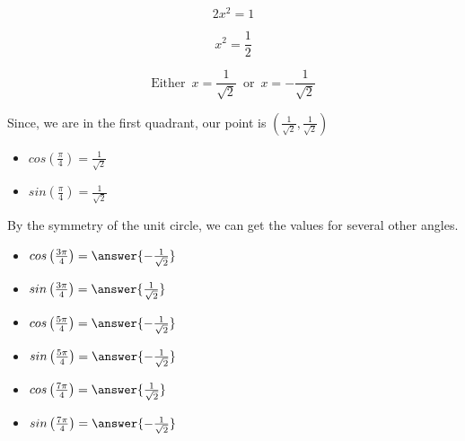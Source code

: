 \documentclass{ximera}
\begin{document}
\[  2  x^2 = 1 \]

\[  x^2 = \frac{1}{2} \]


\[  \text{Either } \, x = \frac{1}{\sqrt{2}} \, \text{ or } \,  x = -\frac{1}{\sqrt{2}}   \]


Since, we are in the first quadrant, our point is $\left(\frac{1}{\sqrt{2}}, \frac{1}{\sqrt{2}}\right)$


\begin{itemize}
\item $cos\left(\frac{\pi}{4}\right) = \frac{1}{\sqrt{2}}$ \\
\item $sin\left(\frac{\pi}{4}\right) = \frac{1}{\sqrt{2}}$
\end{itemize}




By the symmetry of the unit circle, we can get the values for several other angles.




\begin{question}



\begin{itemize}
\item $cos\left(\frac{3\pi}{4}\right) = \answer{-\frac{1}{\sqrt{2}}}$ \\
\item $sin\left(\frac{3\pi}{4}\right) = \answer{\frac{1}{\sqrt{2}}}$
\end{itemize}



\end{question}





\begin{question}



\begin{itemize}
\item $cos\left(\frac{5\pi}{4}\right) = \answer{-\frac{1}{\sqrt{2}}}$ \\
\item $sin\left(\frac{5\pi}{4}\right) = \answer{-\frac{1}{\sqrt{2}}}$
\end{itemize}



\end{question}





\begin{question}



\begin{itemize}
\item $cos\left(\frac{7\pi}{4}\right) = \answer{\frac{1}{\sqrt{2}}}$ \\
\item $sin\left(\frac{7\pi}{4}\right) = \answer{-\frac{1}{\sqrt{2}}}$
\end{itemize}



\end{question}
\end{document}
